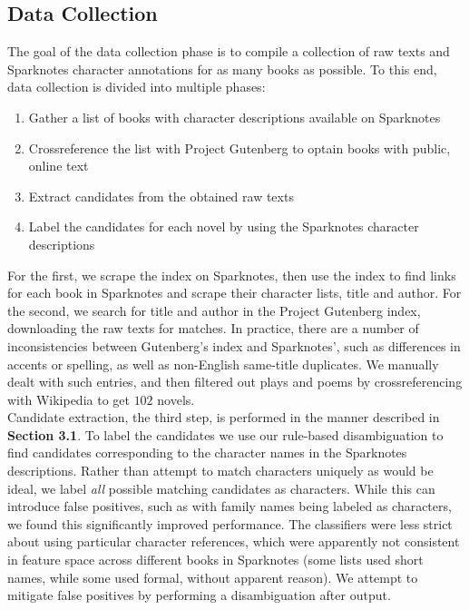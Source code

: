 \documentclass[12pt]{article}
\begin{document}
    \subsection{Data Collection}

        The goal of the data collection phase is to compile a collection of raw texts and Sparknotes
        character annotations for as many books as possible.  To this end, data collection is divided into
        multiple phases: 
        \begin{enumerate}
                \setlength\itemsep{0em}
                \item Gather a list of books with character descriptions available on Sparknotes
                \item Crossreference the list with Project Gutenberg to optain books with public, online text
                \item Extract candidates from the obtained raw texts
                \item Label the candidates for each novel by using the Sparknotes character descriptions
        \end{enumerate}

        For the first, we scrape the index on Sparknotes, then use the index to find links for each
        book in Sparknotes and scrape their character lists, title and author. For the second, we
        search for title and author in the Project Gutenberg index, downloading the raw texts for
        matches. In practice, there are a number of inconsistencies between Gutenberg's index and
        Sparknotes', such as differences in accents or spelling, as well as non-English same-title
        duplicates. We manually dealt with such entries, and then filtered out plays and poems
        by crossreferencing with Wikipedia to get $102$ novels. \\

        Candidate extraction, the third step, is performed in the manner described in \textbf{Section 3.1}. 
        To label the candidates we use our rule-based disambiguation to find candidates corresponding
        to the character names in the Sparknotes descriptions. Rather than attempt to match characters
        uniquely as would be ideal, we label \emph{all} possible matching candidates as
        characters. While this can introduce false positives, such as with family names being labeled
        as characters, we found this significantly improved performance. The classifiers were less strict
        about using particular character references, which were apparently not consistent in feature
        space across different books in Sparknotes (some lists used short names, while some used formal,
        without apparent reason). We attempt to mitigate false positives by performing a disambiguation
        after output. \\ 
\end{document}

